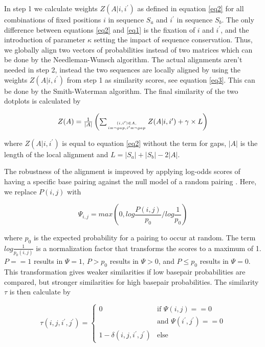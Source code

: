 \documentclass[a4paper,twoside]{article}
\begin{document}
In step 1 we calculate weights $Z(A|i,i^\prime)$ as defined in equation
\ref{eq2} for all combinations of fixed positions $i$ in sequence $S_a$ and
$i^\prime$ in sequence $S_b$.  The only difference between equations \ref{eq2}
and \ref{eq1} is the fixation of $i$ and $i^\prime$, and the introduction of
parameter $\kappa$ setting the impact of sequence conservation. Thus, we
globally align two vectors of probabilities instead of two matrices which can
be done by the Needleman-Wunsch algorithm. The actual alignments aren't needed
in step 2, instead the two sequences are locally aligned by using the weights
$Z(A|i,i^\prime)$ from step 1 as similarity scores, see equation \ref{eq3}. This
can be done by the Smith-Waterman algorithm. The final similarity of
the two dotplots is calculated by

\begin{equation}\label{eq4}
\arraycolsep=1.4pt
\begin{array}{rl}
Z(A) = & \frac{1}{|A|} \left( \sum_{(i,i^\prime) \in A,\atop {i=\neg gap, i^\prime=\neg gap}} Z(A|i,i^\prime) + \gamma \times L \right)
\end{array}
\end{equation}

where $Z(A|i,i^\prime)$ is equal to equation \ref{eq2} without the term for
gaps, $|A|$ is the length of the local alignment and $L = |S_a|+|S_b|-2|A|$.

The robustness of the alignment is improved by applying log-odds scores of
having a specific base pairing against the null model of a random pairing
\cite{Will17432929}.  Here, we replace $P(i,j)$ with 

\begin{equation}
	\Psi_{i,j} = max \left( 0, log \frac{P(i,j)}{p_0} / log \frac{1}{p_0} \right)
\end{equation}

where $p_0$ is the expected probability for a pairing to occur at random. The
term $log \frac{1}{p_0(i,j)}$ is a normalization factor that transforms the
scores to a maximum of 1. $P==1$ results in $\Psi=1$, $P>p_0$ results in
$\Psi>0$, and $P\le p_0$ results in $\Psi=0$.  This transformation gives weaker
similarities if low basepair probabilities are compared, but stronger
similarities for high basepair probabilities. The similarity $\tau$ is then
calculate by

\begin{equation}
	\tau(i,j,i^\prime,j^\prime) = \left\{ \begin{array}{cl}
			0 & \textrm{if }\Psi(i,j) == 0 \\
			  & \textrm{and } \Psi(i^\prime,j^\prime) == 0 \\
			1 - \delta(i,j,i^\prime,j^\prime) & \textrm{else}
		\end{array}\right.
\end{equation}
\end{document}
